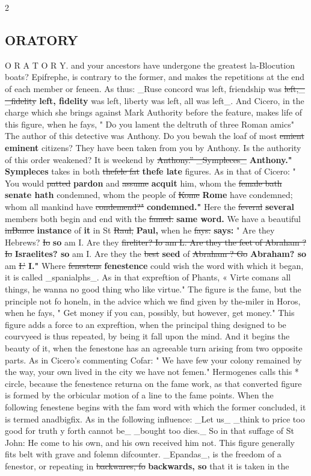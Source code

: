 \documentclass[10pt]{article}
\begin{document}
\begin{multicols}{2}
\subsection*{ORATORY}
O R A T O R Y. and your ancestors have undergone the greatest la-Blocution boats? Epifrephe, is contrary to the former, and makes the repetitions at the end of each member or feneen. As thus: \_Ruse concord was left, friendship was \sout{left,\_ \_fidelity} \textbf{left, fidelity} was left, liberty was left, all was left\_. And Cicero, in the charge which she brings against Mark Authority before the feature, makes life of this figure, when he fays, " Do you lament the deltruth of three Roman amics" The author of this detective was Anthony. Do you bewah the loaf of most \sout{emient} \textbf{eminent} citizens? They have been taken from you by Anthony. Is the authority of this order weakened? It is weekend by \sout{Anthony.” \_Sympleces\_} \textbf{Anthony." Sympleces} takes in both \sout{thefele fat} \textbf{thefe late} figures. As in that of Cicero: " You would \sout{patted} \textbf{pardon} and \sout{assume} \textbf{acquit} him, whom the \sout{female bath} \textbf{senate hath} condemned, whom the people of \sout{Kome} \textbf{Rome} have condemned; whom all mankind have \sout{condemend?"} \textbf{condemned."} Here the \sout{feveral} \textbf{several} members both begin and end with the \sout{famed.} \textbf{same word.} We have a beautiful \sout{inBance} \textbf{instance} of \textbf{it} in St \sout{Raul,} \textbf{Paul,} when he \sout{fays:} \textbf{says:} " Are they Hebrews? \sout{Io} \textbf{so} am I. Are they \sout{fireliter? Io am L. Are they the feet of Abraham ? Io} \textbf{Israelites? so} am I. Are they the \sout{best} \textbf{seed} of \sout{Abraham ? Go} \textbf{Abraham? so} am \sout{I.’} \textbf{I."} Where \sout{fenestens} \textbf{fenestence} could wish the word with which it began, it is called \_spanialphs\_. As in that expreftion of Phants, « Virte comans all things, he wanna no good thing who like virtue." The figure is the fame, but the principle not fo honeln, in the advice which we find given by the-miler in Horos, when he fays, " Get money if you can, possibly, but however, get money." This figure adds a force to an expreftion, when the principal thing designed to be courvyeed is thus repeated, by being it fall upon the mind. And it begins the beauty of it, when the fenestone has an agreeable turn arising from two opposite parts. As in Cicero's commenting Cofar: " We have few your colony remained by the way, your own lived in the city we have not femen." Hermogenes calls this * circle, because the fenestence returna on the fame work, as that converted figure is formed by the orbicular motion of a line to the fame points. When the following fenestene begins with the fam word with which the former concluded, it is termed anadbigfix. As in the following influence: \_Let us\_ \_think to price too good for truth y forth cannot be\_ \_bought too dies.\_ So in that suffage of St John: He come to his own, and his own received him not. This figure generally fits belt with grave and folemn difcounter. \_Epandas\_, is the freedom of a fenestor, or repeating in \sout{backwares, fo} \textbf{backwards, so} that it is taken in the 
\end{multicols}
\end{document}
